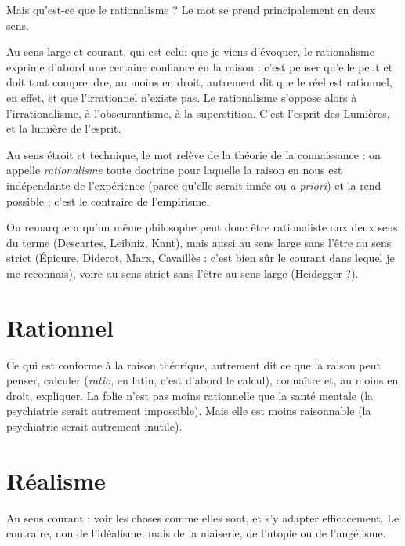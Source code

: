 Mais qu'est-ce que le rationalisme ? Le mot se prend principalement en
deux sens.

Au sens large et courant, qui est celui que je viens d'évoquer, le rationalisme
exprime d’abord une certaine confiance en la raison : c’est penser qu’elle
peut et doit tout comprendre, au moins en droit, autrement dit que le réel est
rationnel, en effet, et que l’irrationnel n’existe pas. Le rationalisme s’oppose
alors à l’irrationalisme, à l’obscurantisme, à la superstition. C’est l'esprit des
Lumières, et la lumière de l'esprit.

Au sens étroit et technique, le mot relève de la théorie de la connaissance :
on appelle {\it rationalisme} toute doctrine pour laquelle la raison en nous est indépendante
de l'expérience (parce qu’elle serait innée ou {\it a priori}) et la rend
possible ; c’est le contraire de l’empirisme.

On remarquera qu’un même philosophe peut donc être rationaliste aux
deux sens du terme (Descartes, Leibniz, Kant), mais aussi au sens large sans
l’être au sens strict (Épicure, Diderot, Marx, Cavaillès : c’est bien sûr le courant
dans lequel je me reconnais), voire au sens strict sans l’être au sens large (Heidegger ?).

\section{Rationnel}
Ce qui est conforme à la raison théorique, autrement dit ce
que la raison peut penser, calculer ({\it ratio}, en latin, c’est
d’abord le calcul), connaître et, au moins en droit, expliquer. La folie n’est pas
moins rationnelle que la santé mentale (la psychiatrie serait autrement impossible).
Mais elle est moins raisonnable (la psychiatrie serait autrement inutile).

\section{Réalisme}
Au sens courant : voir les choses comme elles sont, et s’y adapter
efficacement. Le contraire, non de l’idéalisme, mais de la niaiserie,
de l’utopie ou de l’angélisme.

